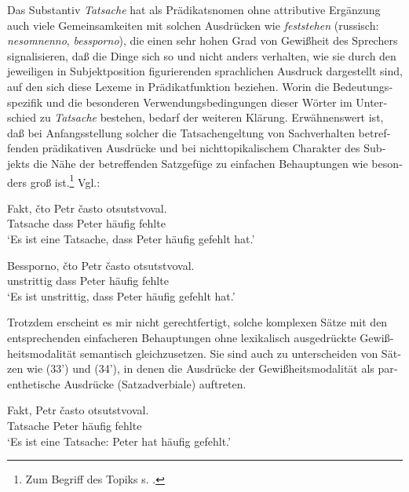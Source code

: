 \documentclass[output=paper]{langscibook}
\begin{document}
\begin{otherlanguage}{german}
\noindent Das Substantiv \textit{Tatsache} hat als Prädikatsnomen ohne attributive Ergänzung auch viele Gemeinsamkeiten mit solchen Ausdrücken wie \textit{feststehen} (russisch: \textit{ne\-so\-mnen\-no}, \textit{bessporno}), die einen sehr hohen Grad von Gewißheit des Sprechers signalisieren, daß die Dinge sich so und nicht anders verhalten, wie sie durch den jeweiligen in Subjektposition figurierenden sprachlichen Ausdruck dargestellt sind, auf den sich diese Lexeme in Prädikatfunktion beziehen. Worin die Bedeutungsspezifik und die besonderen Verwendungsbedingungen dieser Wörter im Unterschied zu \textit{Tatsache} bestehen, bedarf der weiteren Klärung. Erwähnenswert ist, daß bei Anfangsstellung solcher die Tatsachengeltung von Sachverhalten betreffenden prädikativen Ausdrücke und bei nichttopikalischem Charakter des Subjekts die Nähe der betreffenden Satzgefüge zu einfachen Behauptungen wie  besonders groß ist.\footnote{Zum Begriff des Topiks s. \citet{Pasch78Topik-vs., pasch1983mechanismen-der-inhaltlichen-gliederung-von-satzen}.} Vgl.:

\ea \label{ex:zi83:33}
    \gll Fakt, čto Petr často otsutstvoval. \\
    Tatsache dass Peter häufig fehlte \\
    \glt ‘Es ist eine Tatsache, dass Peter häufig gefehlt hat.’
    
\ex \label{ex:zi83:34}
    \gll Bessporno, čto Petr často otsutstvoval. \\
    unstrittig dass Peter häufig fehlte \\
    \glt ‘Es ist unstrittig, dass Peter häufig gefehlt hat.’
    
\z

\noindent Trotzdem erscheint es mir nicht gerechtfertigt, solche komplexen Sätze mit den entsprechenden einfacheren Behauptungen ohne lexikalisch ausgedrückte Ge\-wiß\-heits\-mo\-da\-li\-tät semantisch gleichzusetzen. Sie sind auch zu unterscheiden von Sätzen wie %
(33’) und (34’), in denen die Ausdrücke der Ge\-wiß\-heits\-mo\-da\-li\-tät als parenthetische Ausdrücke (Satzadverbiale) auftreten.

\begin{exe}
     \label{ex:zi83:33'}
        \gll Fakt, Petr často otsutstvoval.\\
        Tatsache Peter häufig fehlte \\
        \glt ‘Es ist eine Tatsache: Peter hat häufig gefehlt.’
        

\end{exe}
\end{otherlanguage}
\end{document}
